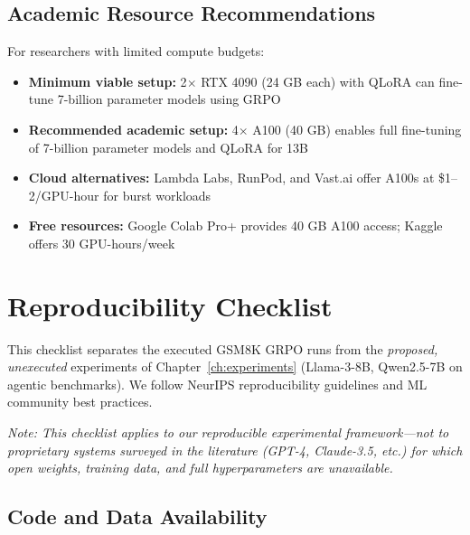 \documentclass[12pt,a4paper]{report}
\theoremstyle{definition}
\begin{document}
\section*{Academic Resource Recommendations}

For researchers with limited compute budgets:
\begin{itemize}
    \item \textbf{Minimum viable setup:} 2$\times$ RTX 4090 (24 GB each) with QLoRA can fine-tune 7-billion parameter models using GRPO
    \item \textbf{Recommended academic setup:} 4$\times$ A100 (40 GB) enables full fine-tuning of 7-billion parameter models and QLoRA for 13B
    \item \textbf{Cloud alternatives:} Lambda Labs, RunPod, and Vast.ai offer A100s at \$1--2/GPU-hour for burst workloads
    \item \textbf{Free resources:} Google Colab Pro+ provides 40 GB A100 access; Kaggle offers 30 GPU-hours/week
\end{itemize}

\chapter{Reproducibility Checklist}
\label{app:reproducibility}

This checklist separates the executed GSM8K GRPO runs from the \textit{proposed, unexecuted} experiments of Chapter~\ref{ch:experiments} (Llama-3-8B, Qwen2.5-7B on agentic benchmarks). We follow NeurIPS reproducibility guidelines and ML community best practices.

\textit{Note: This checklist applies to our reproducible experimental framework---not to proprietary systems surveyed in the literature (GPT-4, Claude-3.5, etc.) for which open weights, training data, and full hyperparameters are unavailable.}

\section*{Code and Data Availability}
\end{document}
